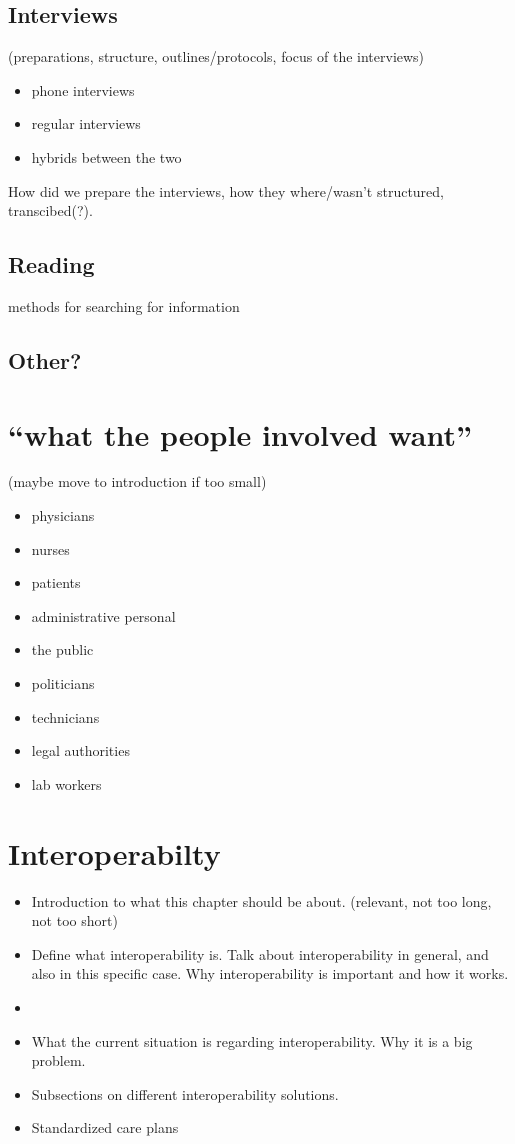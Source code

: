 \documentclass[12pt]{article}
\begin{document}
\subsection{Interviews}
(preparations, structure, outlines/protocols, focus of the interviews)
\begin{itemize}
\item phone interviews
\item regular interviews
\item hybrids between the two
\end{itemize}

How did we prepare the interviews, how they where/wasn’t structured, transcibed(?).

\subsection{Reading}
methods for searching for information

\subsection{Other?}

\section{“what the people involved want” }
(maybe move to introduction if too small)
\begin{itemize}
\item physicians
\item nurses
\item patients
\item administrative personal
\item the public
\item politicians
\item technicians
\item legal authorities
\item lab workers
\end{itemize}
\section{Interoperabilty}

\begin{itemize}
\item Introduction to what this chapter should be about. (relevant, not too long, not too short)
\item Define what interoperability is. Talk about interoperability in general, and also in this specific case. Why interoperability is important and how it works. \item 
\item What the current situation is regarding interoperability. Why it is a big problem.
\item Subsections on different interoperability solutions.
\item Standardized care plans
\end{itemize}
\end{document}
